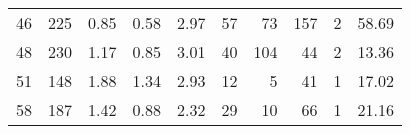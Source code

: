 \begin{tabular}{rrrrrrrrrr}
46 &      225 &                             0.85 &                             0.58 &                             2.97 &              57 &              73 &                       157 &          2 &                        58.69 \\
48 &      230 &                             1.17 &                             0.85 &                             3.01 &              40 &             104 &                        44 &          2 &                        13.36 \\
51 &      148 &                             1.88 &                             1.34 &                             2.93 &              12 &               5 &                        41 &          1 &                        17.02 \\
58 &      187 &                             1.42 &                             0.88 &                             2.32 &              29 &              10 &                        66 &          1 &                        21.16 \\
\bottomrule
\end{tabular}
